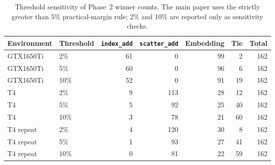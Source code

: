 \begin{table}[!htbp]
\centering\small
\caption{Threshold sensitivity of Phase~2 winner counts. The main paper uses the strictly greater than 5\% practical-margin rule; 2\% and 10\% are reported only as sensitivity checks.}
\label{tab:threshold-sensitivity-phase2}
\setlength{\tabcolsep}{3pt}
\renewcommand{\arraystretch}{1.12}
\begin{tabular}{llrrrrr}
\toprule
Environment & Threshold & \texttt{index\_add} & \texttt{scatter\_add} & Embedding & Tie & Total \\
\midrule
GTX1650Ti & 2\% & 61 & 0 & 99 & 2 & 162 \\
GTX1650Ti & 5\% & 60 & 0 & 96 & 6 & 162 \\
GTX1650Ti & 10\% & 52 & 0 & 91 & 19 & 162 \\
T4 & 2\% & 9 & 113 & 28 & 12 & 162 \\
T4 & 5\% & 5 & 92 & 25 & 40 & 162 \\
T4 & 10\% & 3 & 78 & 21 & 60 & 162 \\
T4 repeat & 2\% & 4 & 120 & 30 & 8 & 162 \\
T4 repeat & 5\% & 1 & 93 & 27 & 41 & 162 \\
T4 repeat & 10\% & 0 & 81 & 22 & 59 & 162 \\
\bottomrule
\end{tabular}
\end{table}
